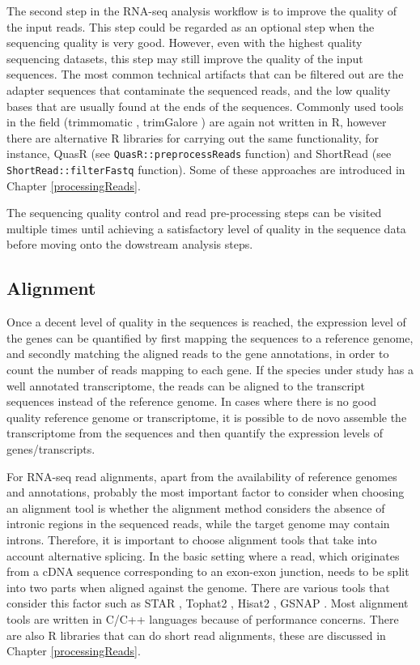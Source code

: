 \documentclass[12pt,]{krantz}
\begin{document}
The second step in the RNA-seq analysis workflow is to improve the quality of the input reads. This step could be regarded as an optional step when the sequencing quality is very good. However, even with the highest quality sequencing datasets, this step may still improve the quality of the input sequences. The most common technical artifacts that can be filtered out are the adapter sequences that contaminate the sequenced reads, and the low quality bases that are usually found at the ends of the sequences. Commonly used tools in the field (trimmomatic \citep{bolger_trimmomatic:_2014}, trimGalore \citep{noauthor_babraham_nodate-1}) are again not written in R, however there are alternative R libraries for carrying out the same functionality, for instance, QuasR \citep{gaidatzis_quasr:_2015} (see \texttt{QuasR::preprocessReads} function) and ShortRead \citep{morgan_shortread:_2009} (see \texttt{ShortRead::filterFastq} function). Some of these approaches are introduced in Chapter \ref{processingReads}.

The sequencing quality control and read pre-processing steps can be visited multiple times until achieving a satisfactory level of quality in the sequence data before moving onto the dowstream analysis steps.

\hypertarget{alignment}{%
\subsection{Alignment}\label{alignment}}

Once a decent level of quality in the sequences is reached, the expression level of the genes can be quantified by first mapping the sequences to a reference genome, and secondly matching the aligned reads to the gene annotations, in order to count the number of reads mapping to each gene. If the species under study has a well annotated transcriptome, the reads can be aligned to the transcript sequences instead of the reference genome. In cases where there is no good quality reference genome or transcriptome, it is possible to de novo assemble the transcriptome from the sequences and then quantify the expression levels of genes/transcripts.

For RNA-seq read alignments, apart from the availability of reference genomes and annotations, probably the most important factor to consider when choosing an alignment tool is whether the alignment method considers the absence of intronic regions in the sequenced reads, while the target genome may contain introns. Therefore, it is important to choose alignment tools that take into account alternative splicing. In the basic setting where a read, which originates from a cDNA sequence corresponding to an exon-exon junction, needs to be split into two parts when aligned against the genome. There are various tools that consider this factor such as STAR \citep{dobin_star:_2013}, Tophat2 \citep{kim_tophat2:_2013}, Hisat2 \citep{kim_hisat:_2015}, GSNAP \citep{wu_gmap_2016}. Most alignment tools are written in C/C++ languages because of performance concerns. There are also R libraries that can do short read alignments, these are discussed in Chapter \ref{processingReads}.
\end{document}
